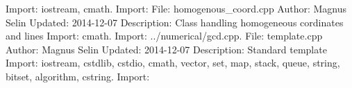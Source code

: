 \documentclass[a4paper]{article}
\begin{document}
\begin{multicols}{2}
Import: iostream, cmath.\newline 
Import: \newline 
File: homogenous\_coord.cpp\newline 
Author: Magnus Selin\newline 
Updated: 2014-12-07\newline 
Description: Class handling homogeneous cordinates and lines\newline 
Import: cmath.\newline 
Import: ../numerical/gcd.cpp.\newline 
File: template.cpp\newline 
Author: Magnus Selin\newline 
Updated: 2014-12-07\newline 
Description: Standard template\newline 
Import: iostream, cstdlib, cstdio, cmath, vector, set, map, stack, queue, string, bitset, algorithm, cstring.\newline 
Import: \newline 


\end{multicols}
\end{document}
